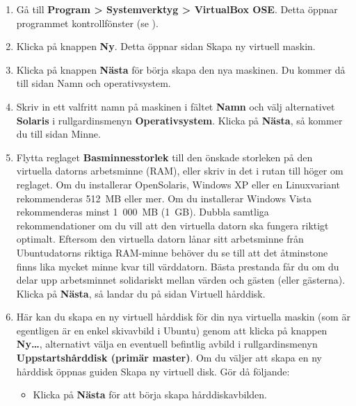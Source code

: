 \documentclass[a4paper,final]{memoir} %
\begin{document}
\begin{enumerate}

\item Gå till \textbf{Program \textgreater{} Systemverktyg \textgreater{} VirtualBox OSE}. Detta öppnar programmet kontrollfönster (se ).


\item Klicka på knappen \textbf{Ny}. Detta öppnar sidan Skapa ny virtuell maskin.

\item Klicka på knappen \textbf{Nästa} för börja skapa den nya maskinen. Du kommer då till sidan Namn och operativsystem.

\item Skriv in ett valfritt namn på maskinen i fältet \textbf{Namn} och välj alternativet \textbf{Solaris} i rullgardinsmenyn \textbf{Operativsystem}. Klicka på \textbf{Nästa}, så kommer du till sidan Minne. 

\item Flytta reglaget \textbf{Basminnesstorlek} till den önskade storleken på den virtuella datorns arbetsminne (RAM), eller skriv in det i rutan till höger om reglaget. Om du installerar OpenSolaris, Windows XP eller en Linuxvariant rekommenderas 512~MB eller mer. Om du installerar Windows Vista rekommenderas minst 1~000~MB (1~GB). Dubbla samtliga rekommendationer om du vill att den virtuella datorn ska fungera riktigt optimalt. Eftersom den virtuella datorn lånar sitt arbetsminne från Ubuntudatorns riktiga RAM-minne behöver du se till att det åtminstone finns lika mycket minne kvar till värddatorn. Bästa prestanda får du om du delar upp arbetsminnet solidariskt mellan värden och gästen (eller gästerna). Klicka på \textbf{Nästa}, så landar du på sidan Virtuell hårddisk.

\item Här kan du skapa en ny virtuell hårddisk för din nya virtuella maskin (som är egentligen är en enkel skivavbild i Ubuntu) genom att klicka på knappen \textbf{Ny\ldots{}}, alternativt välja en eventuell befintlig avbild i rullgardinsmenyn \textbf{Uppstartshårddisk (primär master)}. Om du väljer att skapa en ny hårddisk öppnas guiden Skapa ny virtuell disk. Gör då följande:

\begin{itemize}

\item Klicka på \textbf{Nästa} för att börja skapa hårddiskavbilden.


\end{itemize}
\end{enumerate}
\end{document}
